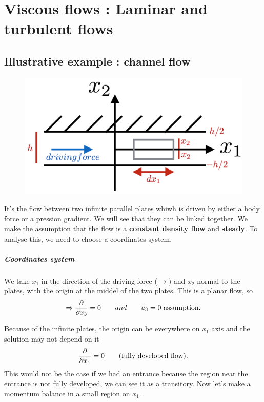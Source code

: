 
\chapter{Viscous flows : Laminar and turbulent flows}
	\section{Illustrative example : channel flow}
		
		\begin{figure}
		\vspace{-5mm}
		\includegraphics[scale=0.35]{ch4/1}
		\end{figure}
		It's the flow between two infinite parallel plates whiwh is driven by either a body force or a pression gradient. We will see that they can be linked together. We make the assumption that the flow is a \textbf{constant density flow} and \textbf{steady}. To analyse this, we need to choose a coordinates system. 

		\paragraph{Coordinates system}		
		We take $x_1$ in the direction of the driving force ($\rightarrow$) and $x_2$ normal to the plates, with the origin at the middel of the two plates. This is a planar flow, so
		\begin{equation}
			\Rightarrow  \frac{\D}{\D x_3}=0 \qquad and \qquad u_3 = 0 \mbox{ assumption}. 
		\end{equation}
		
		Because of the infinite plates, the origin can be everywhere on $x_1$ axis and the solution may not depend on it 
		\begin{equation}
			\frac{\D}{\D x_1} = 0 \qquad \mbox{(fully developed flow)}.
		\end{equation}
		This would not be the case if we had an entrance because the region near the entrance is not fully developed, we can see it as a transitory. Now let's make a momentum balance in a small region on $x_1$.
		
